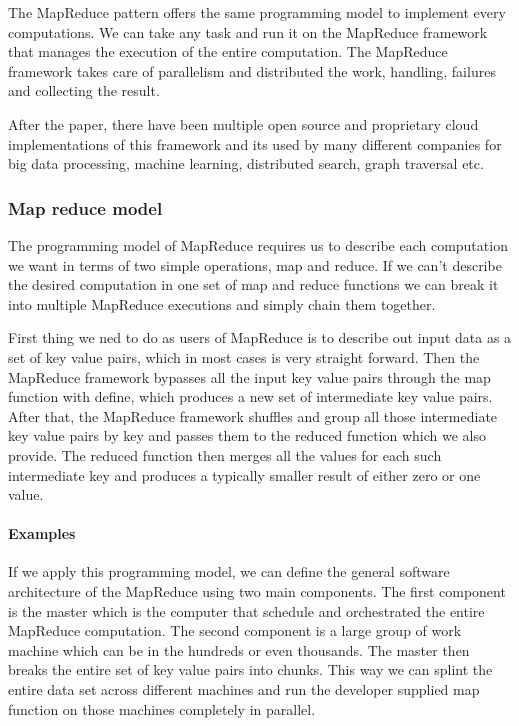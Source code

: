 The MapReduce pattern offers the same programming model to implement every computations.
We can take any task and run it on the MapReduce framework that manages the execution of the entire computation.
The MapReduce framework takes care of parallelism and distributed the work, handling, failures and collecting the result.

After the paper, there have been multiple open source and proprietary cloud implementations of this framework and its used by many different companies for big data processing, machine learning, distributed search, graph traversal etc.

\subsubsection{Map reduce model}
The programming model of MapReduce requires us to describe each computation we want in terms of two simple operations, map and reduce.
If we can't describe the desired computation in one set of map and reduce functions we can break it into multiple MapReduce executions and simply chain them together.

First thing we ned to do as users of MapReduce is to describe out input data as a set of key value pairs, which in most cases is very straight forward.
Then the MapReduce framework bypasses all the input key value pairs through the map function with define, which produces a new set of intermediate key value pairs.
After that, the MapReduce framework shuffles and group all those intermediate key value pairs by key and passes them to the reduced function which we also provide.
The reduced function then merges all the values for each such intermediate key and produces a typically smaller result of either zero or one value.

\paragraph{Examples}

If we apply this programming model, we can define the general software architecture of the MapReduce using two main components.
The first component is the master which is the computer that schedule and orchestrated the entire MapReduce computation.
The second component is a large group of work machine which can be in the hundreds or even thousands.
The master then breaks the entire set of key value pairs into chunks.
This way we can splint the entire data set across different machines and run the developer supplied map function on those machines completely in parallel.


